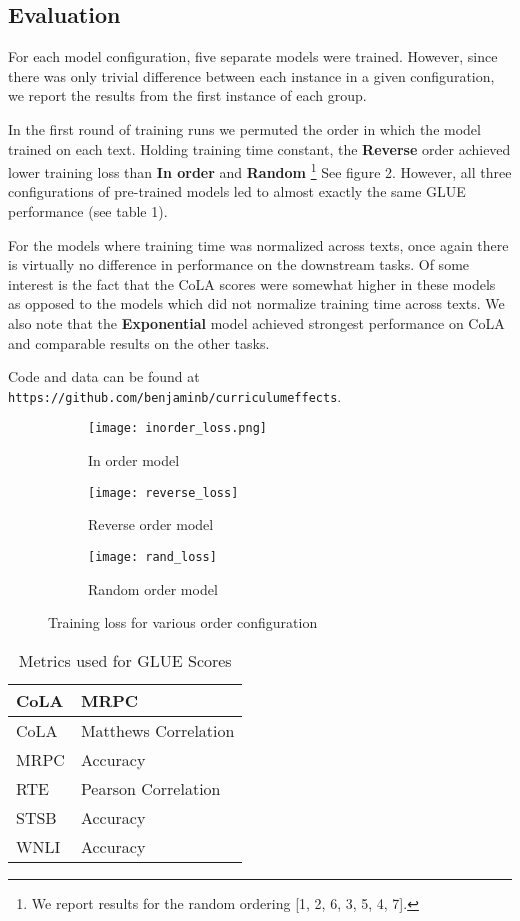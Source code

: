 \documentclass{article}
\begin{document}
\subsection{Evaluation}

For each model configuration, five separate models were trained. However, since there was only trivial difference between each instance in a given configuration, we report the results from the first instance of each group.

In the first round of training runs we permuted the order in which the model trained on each text. Holding training time constant, the \textbf{Reverse} order achieved lower training loss than \textbf{In order} and \textbf{Random} \footnote{We report results for the random ordering [1, 2, 6, 3, 5, 4, 7].} See figure 2. However, all three configurations of pre-trained models led to almost exactly the same GLUE performance (see table 1).

For the models where training time was normalized across texts, once again there is virtually no difference in performance on the downstream tasks. Of some interest is the fact that the CoLA scores were somewhat higher in these models as opposed to the models which did not normalize training time across texts. We also note that the \textbf{Exponential} model achieved strongest performance on CoLA and comparable results on the other tasks.

Code and data can be found at \texttt{https://github.com/benjaminb/curriculumeffects}.

\begin{figure}
\centering
\begin{subfigure}{.3\textwidth}
  \centering
  \texttt{[image: inorder\_loss.png]}
  \caption{In order model}
  \label{fig:sub1}
\end{subfigure}%
\begin{subfigure}{.3\textwidth}
  \centering
  \texttt{[image: reverse\_loss]}
  \caption{Reverse order model}
  \label{fig:sub2}
\end{subfigure}
\begin{subfigure}{.3\textwidth}
  \centering
  \texttt{[image: rand\_loss]}
  \caption{Random order model}
  \label{fig:sub2}
\end{subfigure}
\caption{Training loss for various order configuration}
\label{fig:test}
\end{figure}

\begin{table}
  \caption{Metrics used for GLUE Scores}
  \label{sample-table}
  \centering
  \begin{tabular}{ll}
    \toprule
    \cmidrule(r){1-2}
    CoLA & MRPC\\
    \midrule
    CoLA & Matthews Correlation \\
    MRPC & Accuracy \\
    RTE & Pearson Correlation \\
    STSB & Accuracy \\
    WNLI & Accuracy \\
    \bottomrule
  \end{tabular}
\end{table}
\end{document}
